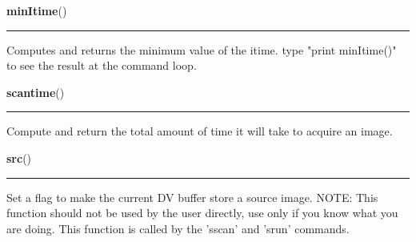     \begin{boxedminipage}{\textwidth}

    \raggedright \textbf{minItime}()

    \vspace{-1.5ex}

    \rule{\textwidth}{0.5\fboxrule}
    Computes and returns the minimum value of the itime. type "print 
    minItime()" to see the result at the command loop.

    \vspace{1ex}

    \end{boxedminipage}

    \label{runrun:scantime}

    \vspace{0.5ex}

    \begin{boxedminipage}{\textwidth}

    \raggedright \textbf{scantime}()

    \vspace{-1.5ex}

    \rule{\textwidth}{0.5\fboxrule}
    Compute and return the total amount of time it will take to acquire an 
    image.

    \vspace{1ex}

    \end{boxedminipage}

    \label{runrun:src}

    \vspace{0.5ex}

    \begin{boxedminipage}{\textwidth}

    \raggedright \textbf{src}()

    \vspace{-1.5ex}

    \rule{\textwidth}{0.5\fboxrule}
    Set a flag to make the current DV buffer store a source image. NOTE: 
    This function should not be used by the user directly, use only if you 
    know what you are doing. This function is called by the 'sscan' and 
    'srun' commands.

    \vspace{1ex}

    \end{boxedminipage}

